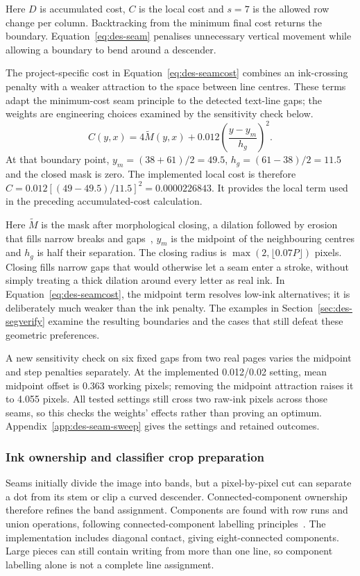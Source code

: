 Here $D$ is accumulated cost, $C$ is the local cost and $s=7$ is the allowed row change per column. Backtracking from the minimum final cost returns the boundary. Equation~\ref{eq:des-seam} penalises unnecessary vertical movement while allowing a boundary to bend around a descender.

The project-specific cost in Equation~\ref{eq:des-seamcost} combines an ink-crossing penalty with a weaker attraction to the space between line centres. These terms adapt the minimum-cost seam principle to the detected text-line gaps; the weights are engineering choices examined by the sensitivity check below.
\begin{equation}
C(y,x)=4\widetilde M(y,x)
+0.012\left(\frac{y-y_m}{h_g}\right)^2.
\label{eq:des-seamcost}
\end{equation}
At that boundary point, $y_m=(38+61)/2=49.5$, $h_g=(61-38)/2=11.5$ and the closed mask is zero. The implemented local cost is therefore $C=0.012[(49-49.5)/11.5]^2=0.0000226843$. It provides the local term used in the preceding accumulated-cost calculation.

Here $\widetilde M$ is the mask after morphological closing, a dilation followed by erosion that fills narrow breaks and gaps~\cite[p.~541]{haralick1987}, $y_m$ is the midpoint of the neighbouring centres and $h_g$ is half their separation. The closing radius is $\max(2,\lfloor0.07P\rfloor)$ pixels. Closing fills narrow gaps that would otherwise let a seam enter a stroke, without simply treating a thick dilation around every letter as real ink. In Equation~\ref{eq:des-seamcost}, the midpoint term resolves low-ink alternatives; it is deliberately much weaker than the ink penalty. The examples in Section~\ref{sec:des-segverify} examine the resulting boundaries and the cases that still defeat these geometric preferences.

A new sensitivity check on six fixed gaps from two real pages varies the midpoint and step penalties separately. At the implemented 0.012/0.02 setting, mean midpoint offset is 0.363 working pixels; removing the midpoint attraction raises it to 4.055 pixels. All tested settings still cross two raw-ink pixels across those seams, so this checks the weights' effects rather than proving an optimum. Appendix~\ref{app:des-seam-sweep} gives the settings and retained outcomes.

\subsubsection{Ink ownership and classifier crop preparation}
Seams initially divide the image into bands, but a pixel-by-pixel cut can separate a dot from its stem or clip a curved descender. Connected-component ownership therefore refines the band assignment. Components are found with row runs and union operations, following connected-component labelling principles~\cite[pp.~476--479]{rosenfeld1966}. The implementation includes diagonal contact, giving eight-connected components. Large pieces can still contain writing from more than one line, so component labelling alone is not a complete line assignment.

